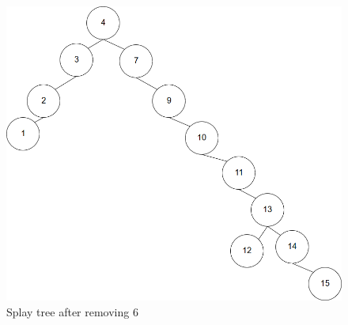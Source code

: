 \documentclass{article}
\begin{document}
\begin{enumerate}
\begin{figure}[H]
 	  \centering
 	  \caption{Splay tree after removing 6}
 	  \label{Trees:SplayR3}
	  \includegraphics[width=\textwidth]{SplayR3}
    \end{figure}
    

\end{enumerate}
\end{document}
